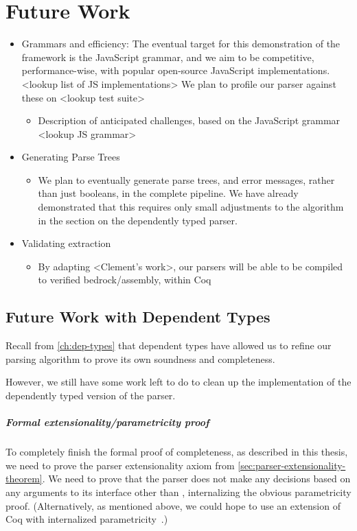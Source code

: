 \chapter{Future Work}
  \begin{itemize} \item  Grammars and efficiency: The eventual target for this demonstration of the framework is the JavaScript grammar, and we aim to be competitive, performance-wise, with popular open-source JavaScript implementations. <lookup list of JS implementations>  We plan to profile our parser against these on <lookup test suite>
    \begin{itemize} \item  Description of anticipated challenges, based on the JavaScript grammar <lookup JS grammar> \end{itemize}
  \item  Generating Parse Trees
    \begin{itemize} \item  We plan to eventually generate parse trees, and error messages, rather than just booleans, in the complete pipeline.  We have already demonstrated that this requires only small adjustments to the algorithm in the section on the dependently typed parser. \end{itemize}
  \item  Validating extraction
    \begin{itemize} \item  By adapting <Clement's work>, our parsers will be able to be compiled to verified bedrock/assembly, within Coq \end{itemize}
    \end{itemize}
\section{Future Work with Dependent Types}
  Recall from \autoref{ch:dep-types} that dependent types have allowed us to refine our parsing algorithm to prove its own soundness and completeness.
  
  However, we still have some work left to do to clean up the implementation of the dependently typed version of the parser.
  
  \paragraph{Formal extensionality/parametricity proof}
    To completely finish the formal proof of completeness, as described in this thesis, we need to prove the parser extensionality axiom from \autoref{sec:parser-extensionality-theorem}.  We need to prove that the parser does not make any decisions based on any arguments to its interface other than , internalizing the obvious parametricity proof.  (Alternatively, as mentioned above, we could hope to use an extension of Coq with internalized parametricity~\cite{InColor}.)

